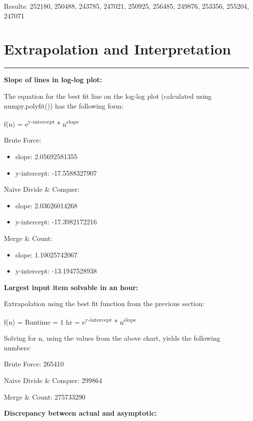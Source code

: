 \documentclass[letterpaper,10pt,titlepage,fleqn]{article}
\begin{document}
Results:
252180, 250488, 243785, 247021, 250925, 256485, 249876, 253356, 255204, 247071

\section*{Extrapolation and Interpretation}
\hrule

\begin{centering}
\textbf{Slope of lines in log-log plot:}
\end{centering}

The equation for the best fit line on the log-log plot (calculated using numpy.polyfit()) has the following form:

f(n) = e\textsuperscript{y-intercept} * n\textsuperscript{slope}

Brute Force:
\begin{itemize}
\item slope: 2.05692581355
\item y-intercept: -17.5588327907
\end{itemize}

Naive Divide \& Conquer:
\begin{itemize}
\item slope: 2.03626014268
\item y-intercept: -17.3982172216
\end{itemize}

Merge \& Count:
\begin{itemize}
\item slope: 1.10025742067
\item y-intercept: -13.1947528938
\end{itemize}

\begin{centering}
\textbf{Largest input item solvable in an hour:}
\end{centering}

Extrapolation using the best fit function from the previous section: 

f(n) = Runtime = 1 hr = e\textsuperscript{y-intercept} * n\textsuperscript{slope}

Solving for n, using the values from the above chart, yields the following numbers: 

Brute Force: 265410

Naive Divide \& Conquer: 299864

Merge \& Count: 275733290

\begin{centering}
\textbf{Discrepancy between actual and asymptotic:}
\end{centering}
\end{document}
